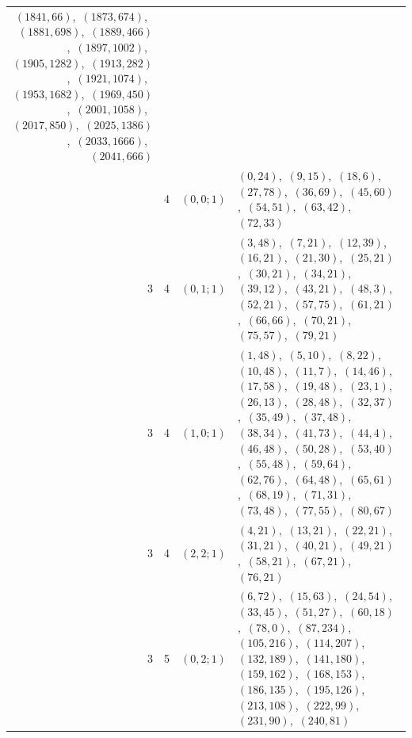 \documentclass[11pt]{article}
\begin{document}
\begin{longtable}{@{}rrl>{\raggedright\arraybackslash}p{}@{}}
$(1841,66)$,\allowbreak\ $(1873,674)$,\allowbreak\ $(1881,698)$,\allowbreak\ $(1889,466)$,\allowbreak\ $(1897,1002)$,\allowbreak\ $(1905,1282)$,\allowbreak\ $(1913,282)$,\allowbreak\ $(1921,1074)$,\allowbreak\ $(1953,1682)$,\allowbreak\ $(1969,450)$,\allowbreak\ $(2001,1058)$,\allowbreak\ $(2017,850)$,\allowbreak\ $(2025,1386)$,\allowbreak\ $(2033,1666)$,\allowbreak\ $(2041,666)$\\
\addlinespace[3pt]
3 & 4 & $(0,0;1)$ & $(0,24)$,\allowbreak\ $(9,15)$,\allowbreak\ $(18,6)$,\allowbreak\ $(27,78)$,\allowbreak\ $(36,69)$,\allowbreak\ $(45,60)$,\allowbreak\ $(54,51)$,\allowbreak\ $(63,42)$,\allowbreak\ $(72,33)$\\
3 & 4 & $(0,1;1)$ & $(3,48)$,\allowbreak\ $(7,21)$,\allowbreak\ $(12,39)$,\allowbreak\ $(16,21)$,\allowbreak\ $(21,30)$,\allowbreak\ $(25,21)$,\allowbreak\ $(30,21)$,\allowbreak\ $(34,21)$,\allowbreak\ $(39,12)$,\allowbreak\ $(43,21)$,\allowbreak\ $(48,3)$,\allowbreak\ $(52,21)$,\allowbreak\ $(57,75)$,\allowbreak\ $(61,21)$,\allowbreak\ $(66,66)$,\allowbreak\ $(70,21)$,\allowbreak\ $(75,57)$,\allowbreak\ $(79,21)$\\
3 & 4 & $(1,0;1)$ & $(1,48)$,\allowbreak\ $(5,10)$,\allowbreak\ $(8,22)$,\allowbreak\ $(10,48)$,\allowbreak\ $(11,7)$,\allowbreak\ $(14,46)$,\allowbreak\ $(17,58)$,\allowbreak\ $(19,48)$,\allowbreak\ $(23,1)$,\allowbreak\ $(26,13)$,\allowbreak\ $(28,48)$,\allowbreak\ $(32,37)$,\allowbreak\ $(35,49)$,\allowbreak\ $(37,48)$,\allowbreak\ $(38,34)$,\allowbreak\ $(41,73)$,\allowbreak\ $(44,4)$,\allowbreak\ $(46,48)$,\allowbreak\ $(50,28)$,\allowbreak\ $(53,40)$,\allowbreak\ $(55,48)$,\allowbreak\ $(59,64)$,\allowbreak\ $(62,76)$,\allowbreak\ $(64,48)$,\allowbreak\ $(65,61)$,\allowbreak\ $(68,19)$,\allowbreak\ $(71,31)$,\allowbreak\ $(73,48)$,\allowbreak\ $(77,55)$,\allowbreak\ $(80,67)$\\
3 & 4 & $(2,2;1)$ & $(4,21)$,\allowbreak\ $(13,21)$,\allowbreak\ $(22,21)$,\allowbreak\ $(31,21)$,\allowbreak\ $(40,21)$,\allowbreak\ $(49,21)$,\allowbreak\ $(58,21)$,\allowbreak\ $(67,21)$,\allowbreak\ $(76,21)$\\
3 & 5 & $(0,2;1)$ & $(6,72)$,\allowbreak\ $(15,63)$,\allowbreak\ $(24,54)$,\allowbreak\ $(33,45)$,\allowbreak\ $(51,27)$,\allowbreak\ $(60,18)$,\allowbreak\ $(78,0)$,\allowbreak\ $(87,234)$,\allowbreak\ $(105,216)$,\allowbreak\ $(114,207)$,\allowbreak\ $(132,189)$,\allowbreak\ $(141,180)$,\allowbreak\ $(159,162)$,\allowbreak\ $(168,153)$,\allowbreak\ $(186,135)$,\allowbreak\ $(195,126)$,\allowbreak\ $(213,108)$,\allowbreak\ $(222,99)$,\allowbreak\ $(231,90)$,\allowbreak\ $(240,81)$\\

\end{longtable}
\end{document}
